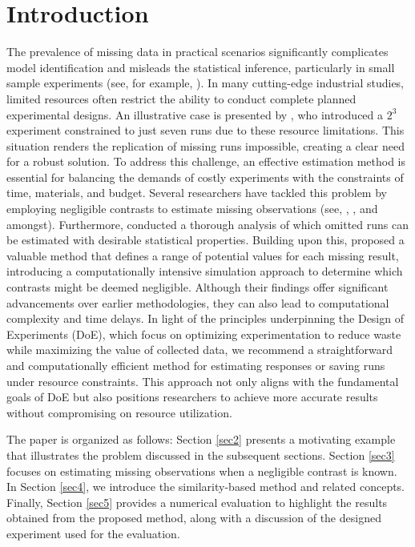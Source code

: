 \documentclass[twoside]{article}
\begin{document}
\section{Introduction}
The prevalence of missing data in practical scenarios significantly complicates model identification and misleads the statistical inference, particularly in small sample experiments (see, for example, \cite{Mot}). In many cutting-edge industrial studies, limited resources often restrict the ability to conduct complete planned experimental designs. An illustrative case is presented by \cite{Grima}, who introduced a \(2^{3}\) experiment constrained to just seven runs due to these resource limitations. This situation renders the replication of missing runs impossible, creating a clear need for a robust solution. To address this challenge, an effective estimation method is essential for balancing the demands of costly experiments with the constraints of time, materials, and budget. Several researchers have tackled this problem by employing negligible contrasts to estimate missing observations (see, \cite{Draper}, \cite{Box}, and \cite{Xampenya} amongst). Furthermore, \cite{Xampenyb} conducted a thorough analysis of which omitted runs can be estimated with desirable statistical properties. Building upon this, \cite{Grima} proposed a valuable method that defines a range of potential values for each missing result, introducing a computationally intensive simulation approach to determine which contrasts might be deemed negligible. Although their findings offer significant advancements over earlier methodologies, they can also lead to computational complexity and time delays. In light of the principles underpinning the Design of Experiments (DoE), which focus on optimizing experimentation to reduce waste while maximizing the value of collected data, we recommend a straightforward and computationally efficient method for estimating responses or saving runs under resource constraints. This approach not only aligns with the fundamental goals of DoE but also positions researchers to achieve more accurate results without compromising on resource utilization. 

The paper is organized as follows: Section \ref{sec2} presents a motivating example that illustrates the problem discussed in the subsequent sections. Section \ref{sec3} focuses on estimating missing observations when a negligible contrast is known. In Section \ref{sec4}, we introduce the similarity-based method and related concepts. Finally, Section \ref{sec5} provides a numerical evaluation to highlight the results obtained from the proposed method, along with a discussion of the designed experiment used for the evaluation.
\end{document}
